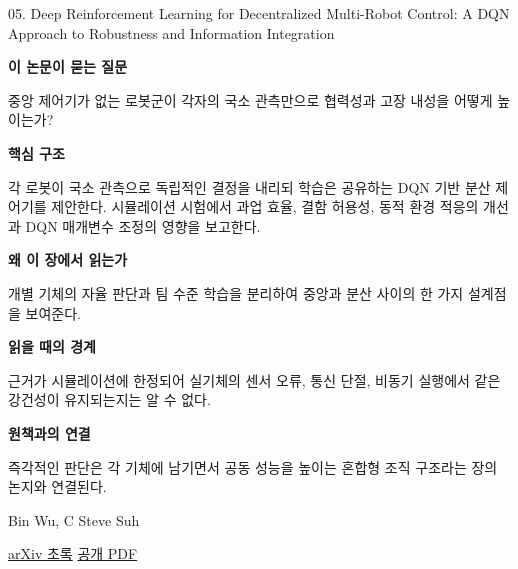 \documentclass[11pt,openany]{book}
\begin{document}
\begin{termcard}{05. Deep Reinforcement Learning for Decentralized Multi-Robot Control: A DQN Approach to Robustness and Information Integration}

\par

\medskip

{\sffamily\bfseries\color{deepblue} 이 논문이 묻는 질문}\par

중앙 제어기가 없는 로봇군이 각자의 국소 관측만으로 협력성과 고장 내성을 어떻게 높이는가?

\smallskip

{\sffamily\bfseries\color{deepblue} 핵심 구조}\par

각 로봇이 국소 관측으로 독립적인 결정을 내리되 학습은 공유하는 DQN 기반 분산 제어기를 제안한다. 시뮬레이션 시험에서 과업 효율, 결함 허용성, 동적 환경 적응의 개선과 DQN 매개변수 조정의 영향을 보고한다.

\smallskip

{\sffamily\bfseries\color{deepblue} 왜 이 장에서 읽는가}\par

개별 기체의 자율 판단과 팀 수준 학습을 분리하여 중앙과 분산 사이의 한 가지 설계점을 보여준다.

\smallskip

{\sffamily\bfseries\color{coral} 읽을 때의 경계}\par

근거가 시뮬레이션에 한정되어 실기체의 센서 오류, 통신 단절, 비동기 실행에서 같은 강건성이 유지되는지는 알 수 없다.

\smallskip

{\sffamily\bfseries\color{teal} 원책과의 연결}\par

즉각적인 판단은 각 기체에 남기면서 공동 성능을 높이는 혼합형 조직 구조라는 장의 논지와 연결된다.

\medskip

{\footnotesize\color{muted} Bin Wu, C Steve Suh\par

\href{https://arxiv.org/abs/2408.11339}{arXiv 초록} \quad \href{https://arxiv.org/pdf/2408.11339}{공개 PDF}\par}

\end{termcard}
\end{document}
